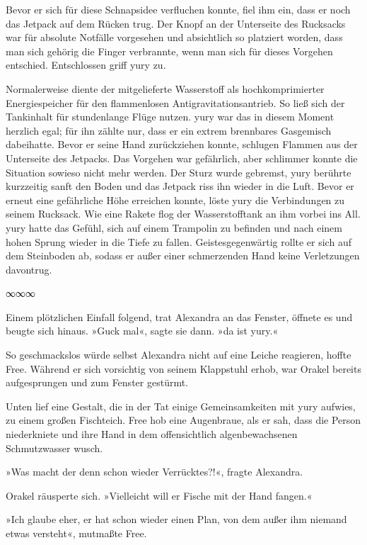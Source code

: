 Bevor er sich für diese Schnapsidee verfluchen konnte, fiel ihm ein, dass er noch das Jetpack auf dem Rücken trug. Der Knopf an der Unterseite des Rucksacks war für absolute Notfälle vorgesehen und absichtlich so platziert worden, dass man sich gehörig die Finger verbrannte, wenn man sich für dieses Vorgehen entschied. Entschlossen griff yury zu.

Normalerweise diente der mitgelieferte Wasserstoff als hochkomprimierter Energiespeicher für den flammenlosen Antigravitationsantrieb. So ließ sich der Tankinhalt für stundenlange Flüge nutzen. yury war das in diesem Moment herzlich egal; für ihn zählte nur, dass er ein extrem brennbares Gasgemisch dabeihatte. Bevor er seine Hand zurückziehen konnte, schlugen Flammen aus der Unterseite des Jetpacks. Das Vorgehen war gefährlich, aber schlimmer konnte die Situation sowieso nicht mehr werden. Der Sturz wurde gebremst, yury berührte kurzzeitig sanft den Boden und das Jetpack riss ihn wieder in die Luft. Bevor er erneut eine gefährliche Höhe erreichen konnte, löste yury die Verbindungen zu seinem Rucksack. Wie eine Rakete flog der Wasserstofftank an ihm vorbei ins All. yury hatte das Gefühl, sich auf einem Trampolin zu befinden und nach einem hohen Sprung wieder in die Tiefe zu fallen. Geistesgegenwärtig rollte er sich auf dem Steinboden ab, sodass er außer einer schmerzenden Hand keine Verletzungen davontrug.

\begin{center}
	∞∞∞
\end{center}

Einem plötzlichen Einfall folgend, trat Alexandra an das Fenster, öffnete es und beugte sich hinaus. »Guck mal«, sagte sie dann. »da ist yury.«

So geschmackslos würde selbst Alexandra nicht auf eine Leiche reagieren, hoffte Free. Während er sich vorsichtig von seinem Klappstuhl erhob, war Orakel bereits aufgesprungen und zum Fenster gestürmt.

Unten lief eine Gestalt, die in der Tat einige Gemeinsamkeiten mit yury aufwies, zu einem großen Fischteich. Free hob eine Augenbraue, als er sah, dass die Person niederkniete und ihre Hand in dem offensichtlich algenbewachsenen Schmutzwasser wusch.

»Was macht der denn schon wieder Verrücktes?!«, fragte Alexandra.

Orakel räusperte sich. »Vielleicht will er Fische mit der Hand fangen.«

»Ich glaube eher, er hat schon wieder einen Plan, von dem außer ihm niemand etwas versteht«, mutmaßte Free.

